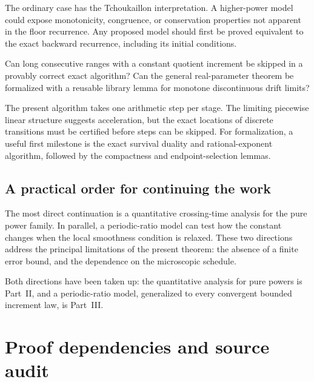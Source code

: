 The ordinary case has the Tchoukaillon interpretation. A higher-power
model could expose monotonicity, congruence, or conservation
properties not apparent in the floor recurrence. Any proposed model
should first be proved equivalent to the exact backward recurrence,
including its initial conditions.

\begin{question}
Can long consecutive ranges with a constant quotient increment be
skipped in a provably correct exact algorithm? Can the general
real-parameter theorem be formalized with a reusable library lemma
for monotone discontinuous drift limits?
\end{question}

The present algorithm takes one arithmetic step per stage. The
limiting piecewise linear structure suggests acceleration, but the
exact locations of discrete transitions must be certified before
steps can be skipped. For formalization, a useful first milestone is
the exact survival duality and rational-exponent algorithm, followed
by the compactness and endpoint-selection lemmas.

\subsection{A practical order for continuing the work}

The most direct continuation is a quantitative crossing-time analysis
for the pure power family. In parallel, a periodic-ratio model can
test how the constant changes when the local smoothness condition is
relaxed. These two directions address the principal limitations of
the present theorem: the absence of a finite error bound, and the
dependence on the microscopic schedule.

\begin{writenote}
Both directions have been taken up: the quantitative analysis for pure
powers is Part~II, and a periodic-ratio model, generalized to every
convergent bounded increment law, is Part~III.
\end{writenote}




\appendix
\section{Proof dependencies and source audit}\label{rex:app:audit}

